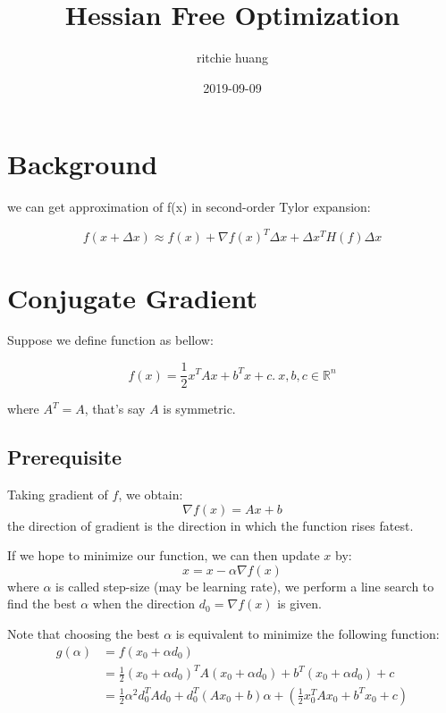 \documentclass[titlepage,a4paper,12pt]{article}
\title{Hessian Free Optimization}
\author{ritchie huang}
\date{2019-09-09}
\begin{document}
\maketitle 

\tableofcontents
\newpage

\section{Background}\label{sec: background}

we can get approximation of f(x) in second-order Tylor expansion:

\begin{equation}
	f(x+\Delta x) \approx f(x)+\nabla f(x)^{T} \Delta x+\Delta x^{T} H(f) \Delta x
\end{equation}

\section{Conjugate Gradient}\label{sec: conjugate gradient}

Suppose we define function as bellow:

\begin{equation}
	f(x) = \frac{1}{2} x^{T} A x + b^{T} x + c. \ x, b, c \in \mathbb{R}^n
\end{equation}

where $A^{T} = A$, that's say $A$ is symmetric.

\subsection{Prerequisite}

Taking gradient of $f$, we obtain:
\begin{equation}
	\nabla f(x) = A x + b
\end{equation}
the direction of gradient is the direction in which the function rises fatest.

If we hope to minimize our function, we can then update $x$ by:
\begin{equation}
	x = x - \alpha \nabla f(x)
\end{equation}
where $\alpha$ is called step-size (may be learning rate), we perform a line search to find the best $\alpha$ when the direction $d_0 = \nabla f(x)$ is given.

Note that choosing the best $\alpha$ is equivalent to minimize the following function:
\begin{equation}
\begin{aligned}
	g(\alpha) &= f(x_0 + \alpha d_0)\\
			  &= \frac{1}{2} (x_0 + \alpha d_0)^{T} A (x_0 + \alpha d_0) + b^{T} (x_0 + \alpha d_0) + c \\
			  &= \frac{1}{2} \alpha^2 d_0^{T} A d_0 + d_0^{T} (A x_0 + b) \alpha + \left( \frac{1}{2} x_0^{T} A x_0 + b^{T} x_0 + c \right)
\end{aligned}
\end{equation}
\end{document}
